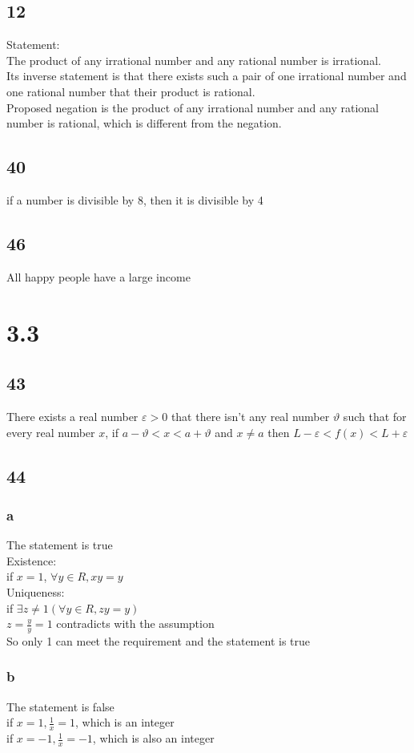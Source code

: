 \documentclass{article}
\begin{document}
\subsection{12}
Statement:\\
The product of any irrational number and any rational number is irrational.\\
Its inverse statement is that there exists such a pair of one irrational number and one rational number that their product is rational.\\
Proposed negation is the product of any irrational number and any rational number is rational, which is different from the negation.
\subsection{40}
if a number is divisible by 8, then it is divisible by 4
\subsection{46}
All happy people have a large income
\section{3.3}
\subsection{43}
There exists a real number $\varepsilon > 0$ that there isn't any real number $\vartheta$  such that for every real number $x$, if $a-\vartheta < x < a+\vartheta $  and $x \neq a$ then $L - \varepsilon < f(x) < L + \varepsilon$
\subsection{44}
\subsubsection{a}
The statement is true\\
Existence:\\
if $x = 1$, $\forall y \in R, xy = y$\\
Uniqueness:\\
if $\exists z \neq 1(\forall y \in R, zy = y)$\\
$z = \frac{y}{y} = 1$ contradicts with the assumption\\
So only 1 can meet the requirement and the statement is true\\
\subsubsection{b}
The statement is false\\
if $x = 1, \frac{1}{x} = 1$, which is an integer\\
if $x = -1, \frac{1}{x} = -1$, which is also an integer\\
\end{document}
